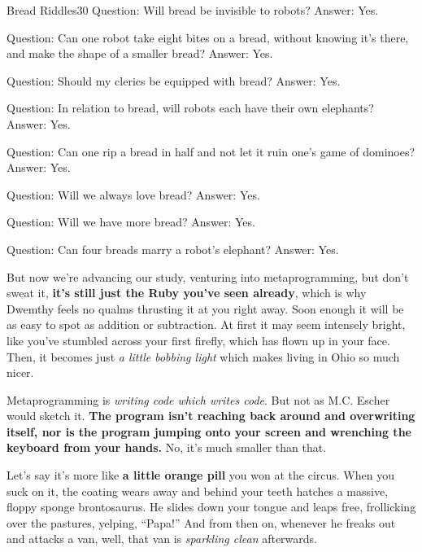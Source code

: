 \documentclass[12pt,twoside]{report}
\begin{document}
	\begin{sidebar}{Bread Riddles}{30}		
		Question: Will bread be invisible to robots? Answer: Yes.\vspace{6pt}
		
		Question: Can one robot take eight bites on a bread, without knowing it's there, and make the shape of a smaller bread? Answer: Yes.\vspace{6pt}
		
		Question: Should my clerics be equipped with bread? Answer: Yes.\vspace{6pt}
		
		Question: In relation to bread, will robots each have their own elephants? Answer: Yes.\vspace{6pt}
		
		Question: Can one rip a bread in half and not let it ruin one's game of dominoes? Answer: Yes.\vspace{6pt}
		
		Question: Will we always love bread? Answer: Yes.\vspace{6pt}
		
		Question: Will we have more bread? Answer: Yes.\vspace{6pt}
		
		Question: Can four breads marry a robot's elephant? Answer: Yes.
	\end{sidebar}

But now we're advancing our study, venturing into metaprogramming, but
don't sweat it, {\bf it's still just the Ruby you've seen already},
which is why Dwemthy feels no qualms thrusting it at you right away.
Soon enough it will be as easy to spot as addition or subtraction.  At
first it may seem intensely bright, like you've stumbled across your
first firefly, which has flown up in your face.  Then, it becomes just
{\em a little bobbing light} which makes living in Ohio so much nicer.

Metaprogramming is {\em writing code which writes code}.  But not as
M.C. Escher would sketch it.  {\bf The program isn't reaching back
  around and overwriting itself, nor is the program jumping onto your
  screen and wrenching the keyboard from your hands.}  No, it's much
smaller than that.

Let's say it's more like {\bf a little orange pill} you won at the
circus.  When you suck on it, the coating wears away and behind your
teeth hatches a massive, floppy sponge brontosaurus.  He slides down
your tongue and leaps free, frollicking over the pastures, yelping,
``Papa!''  And from then on, whenever he freaks out and attacks a van,
well, that van is {\em sparkling clean} afterwards.
\end{document}
